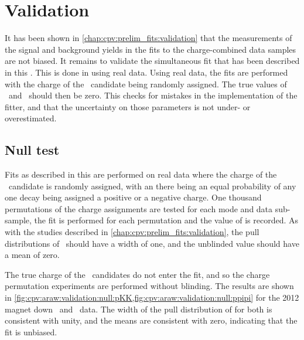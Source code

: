 \section{Validation}
\label{chap:cpv:araw:validation}

It has been shown in \cref{chap:cpv:prelim_fits:validation} that the 
measurements of the signal and background yields in the fits to the 
charge-combined data samples are not biased.
It remains to validate the simultaneous fit that has been described in this 
.
This is done in using real data.
Using real data, the fits are performed with the charge of the \PLambdac\ 
candidate being randomly assigned.
The true values of \ARaw\ and \ARawBg\ should then be zero.
This checks for mistakes in the implementation of the fitter, and that the 
uncertainty on those parameters is not under- or overestimated.

\subsection{Null test}
\label{chap:cpv:araw:validation:null}

Fits as described in this  are performed on real data 
where the charge of the \PLambdac\ candidate is randomly assigned, with an 
there being an equal probability of any one decay being assigned a positive or 
a negative charge.
One thousand permutations of the charge assignments are tested for each mode 
and data sub-sample, the fit is performed for each permutation and the value of 
\ARaw is recorded.
As with the studies described in \cref{chap:cpv:prelim_fits:validation}, the 
pull distributions of \ARaw\ should have a width of one, and the unblinded 
value should have a mean of zero.


The true charge of the \PLambdac\ candidates do not enter the fit, and so the 
charge permutation experiments are performed without blinding.
The results are shown in 
\cref{fig:cpv:araw:validation:null:pKK,fig:cpv:araw:validation:null:ppipi} for 
the 2012 magnet down \pKK\ and \ppipi\ data.
The width of the pull distribution of \ARaw for both is consistent with unity, 
and the means are consistent with zero, indicating that the fit is unbiased.

